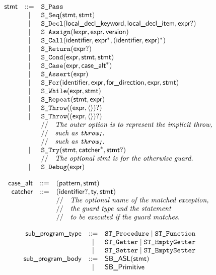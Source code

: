 \documentclass{book}
\begin{document}
\[
\begin{array}{rcl}
\textsf{stmt} &::=& \texttt{S\_Pass}\\
  &|& \texttt{S\_Seq}(\textsf{stmt}, \textsf{stmt})\\
  &|& \texttt{S\_Decl}(\textsf{local\_decl\_keyword}, \textsf{local\_decl\_item}, \textsf{expr}?)\\
  &|& \texttt{S\_Assign}(\textsf{lexpr}, \textsf{expr}, \textsf{version})\\
  &|& \texttt{S\_Call}(\textsf{identifier}, \textsf{expr}^*, (\textsf{identifier}, \textsf{expr})^*)\\
  &|& \texttt{S\_Return}(\textsf{expr}?)\\
  &|& \texttt{S\_Cond}(\textsf{expr}, \textsf{stmt}, \textsf{stmt})\\
  &|& \texttt{S\_Case}(\textsf{expr}, \textsf{case\_alt}^*)\\
  &|& \texttt{S\_Assert}(\textsf{expr})\\
  &|& \texttt{S\_For}(\textsf{identifier}, \textsf{expr}, \textsf{for\_direction}, \textsf{expr}, \textsf{stmt})\\
  &|& \texttt{S\_While}(\textsf{expr}, \textsf{stmt})\\
  &|& \texttt{S\_Repeat}(\textsf{stmt}, \textsf{expr})\\
  &|& \texttt{S\_Throw}((\textsf{expr}, \langle\rangle)?)\\
  &|& \texttt{S\_Throw}((\textsf{expr}, \langle\rangle)?)\\
  & & //\quad\textit{The outer option is to represent the implicit throw,}\ \\
  & & //\quad\textit{such as \texttt{throw;}.}\ \\
  & & //\quad\textit{such as \texttt{throw;}.}\ \\
  &|& \texttt{S\_Try}(\textsf{stmt}, \textsf{catcher}^*, \textsf{stmt}?)\\
  & & //\quad\textit{The optional stmt is for the otherwise guard.}\ \\
  &|& \texttt{S\_Debug}(\textsf{expr})
\end{array}
\]

\[
\begin{array}{rcl}
\textsf{case\_alt} &::=& (\textsf{pattern}, \textsf{stmt})\\
\textsf{catcher} &::=& (\textsf{identifier}?, \textsf{ty}, \textsf{stmt})\\
  & & //\quad\textit{The optional name of the matched exception,}\ \\
  & & //\quad\textit{the guard type and the statement}\ \\
  & & //\quad\textit{to be executed if the guard matches.}\ \\
\end{array}
\]

\[
\begin{array}{rcl}
\textsf{sub\_program\_type} &::=& \texttt{ST\_Procedure} \;|\; \texttt{ST\_Function}\\
                &|  & \texttt{ST\_Getter} \;|\; \texttt{ST\_EmptyGetter}\\
                &|  & \texttt{ST\_Setter} \;|\; \texttt{ST\_EmptySetter}\\
\textsf{sub\_program\_body} &::=& \textsf{SB\_ASL}(\textsf{stmt})\\
  &|& \textsf{SB\_Primitive}\\
\end{array}
\]
\end{document}
